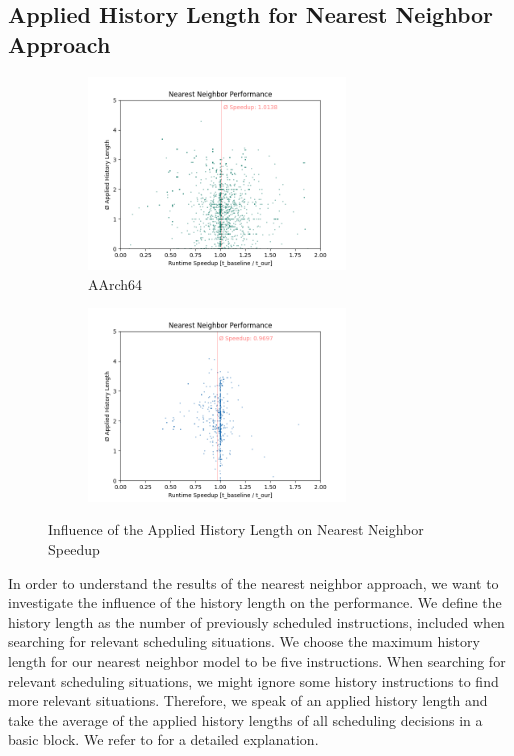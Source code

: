 \subsection{Applied History Length for Nearest Neighbor Approach}
\label{sec:eval:hist-length-vs-perf}
\begin{figure}
    \begin{subfigure}{\textwidth}
        \centering
        \includegraphics[width=0.75\textwidth]{img/nearest-neighbor/rpi_nn_scatter_no_outliers.png}
        \caption{AArch64}
        \label{fig:eval:nn-hist:pi}
    \end{subfigure}
    \vfill
    \begin{subfigure}{\textwidth}
        \centering
        \includegraphics[width=0.75\textwidth]{img/nearest-neighbor/aurora_nn_scatter_no_outliers.png}
        \caption{\aurora{}}
        \label{fig:eval:nn-hist:aurora}
    \end{subfigure}
    \caption{Influence of the Applied History Length on Nearest Neighbor Speedup}
    \label{fig:eval:nn-hist}
\end{figure}
In order to understand the results of the nearest neighbor approach, we want to investigate the influence of the history length on the performance.
We define the history length as the number of previously scheduled instructions, included when searching for relevant scheduling situations.
We choose the maximum history length for our nearest neighbor model to be five instructions.
When searching for relevant scheduling situations, we might ignore some history instructions to find more relevant situations.
Therefore, we speak of an applied history length and take the average of the applied history lengths of all scheduling decisions in a basic block.
We refer to  for a detailed explanation.

